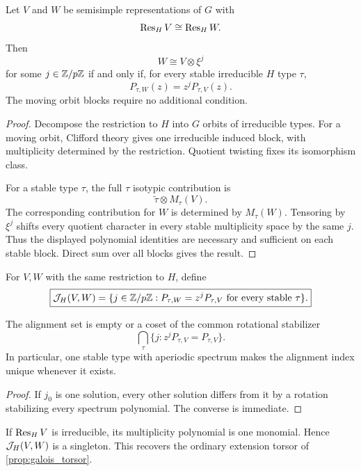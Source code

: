 \begin{theorem}\label{thm:extension_spectrum_criterion}
Let \(V\) and \(W\) be semisimple representations of \(G\) with
\[
 \operatorname{Res}_HV\cong\operatorname{Res}_HW.
\]
Then
\[
 \boxed{
 W\cong V\otimes\xi^j
 }
\]
for some \(j\in\mathbb Z/p\mathbb Z\) if and only if, for every stable irreducible \(H\) type \(\tau\),
\[
 \boxed{
 P_{\tau,W}(z)
 =
 z^jP_{\tau,V}(z).
 }
\]
The moving orbit blocks require no additional condition.
\end{theorem}

\begin{proof}
Decompose the restriction to \(H\) into \(G\) orbits of irreducible types. For a moving orbit, Clifford theory gives one irreducible induced block, with multiplicity determined by the restriction. Quotient twisting fixes its isomorphism class.

For a stable type \(\tau\), the full \(\tau\) isotypic contribution is
\[
 \widetilde\tau\otimes M_\tau(V).
\]
The corresponding contribution for \(W\) is determined by \(M_\tau(W)\). Tensoring by \(\xi^j\) shifts every quotient character in every stable multiplicity space by the same \(j\). Thus the displayed polynomial identities are necessary and sufficient on each stable block. Direct sum over all blocks gives the result.
\end{proof}

\begin{definition}\label{def:alignment_set}
For \(V,W\) with the same restriction to \(H\), define
\[
 \boxed{
 \mathcal J_H(V,W)
 =
 \{j\in\mathbb Z/p\mathbb Z:
 P_{\tau,W}=z^jP_{\tau,V}
 \text{ for every stable }\tau\}.
 }
\]
\end{definition}

\begin{corollary}\label{cor:alignment_coset}
The alignment set is empty or a coset of the common rotational stabilizer
\[
 \bigcap_\tau
 \{j:z^jP_{\tau,V}=P_{\tau,V}\}.
\]
In particular, one stable type with aperiodic spectrum makes the alignment index unique whenever it exists.
\end{corollary}

\begin{proof}
If \(j_0\) is one solution, every other solution differs from it by a rotation stabilizing every spectrum polynomial. The converse is immediate.
\end{proof}

\begin{example}\label{ex:irreducible_stable}
If \(\operatorname{Res}_HV\) is irreducible, its multiplicity polynomial is one monomial. Hence \(\mathcal J_H(V,W)\) is a singleton. This recovers the ordinary extension torsor of \cref{prop:galois_torsor}.
\end{example}



